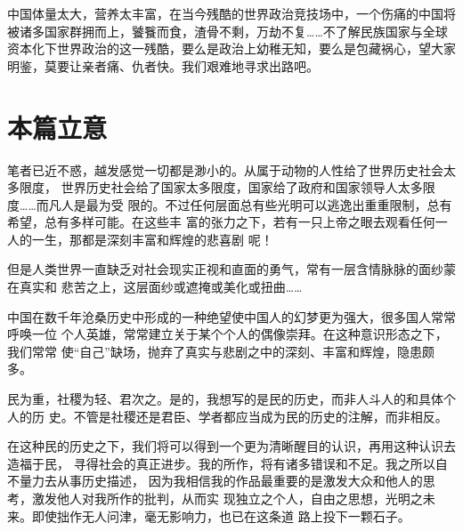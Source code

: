 中国体量太大，营养太丰富，在当今残酷的世界政治竞技场中，一个伤痛的中国将被诸多国家群拥而上，饕餮而食，渣骨不剩，万劫不复……不了解民族国家与全球资本化下世界政治的这一残酷，要么是政治上幼稚无知，要么是包藏祸心，望大家明鉴，莫要让亲者痛、仇者快。我们艰难地寻求出路吧。

\section{本篇立意}

笔者已近不惑，越发感觉一切都是渺小的。从属于动物的人性给了世界历史社会太多限度，
世界历史社会给了国家太多限度，国家给了政府和国家领导人太多限度……而凡人是最为受
限的。不过任何层面总有些光明可以逃逸出重重限制，总有希望，总有多样可能。在这些丰
富的张力之下，若有一只上帝之眼去观看任何一人的一生，那都是深刻丰富和辉煌的悲喜剧
呢！

但是人类世界一直缺乏对社会现实正视和直面的勇气，常有一层含情脉脉的面纱蒙在真实和
悲苦之上，这层面纱或遮掩或美化或扭曲……

中国在数千年沧桑历史中形成的一种绝望使中国人的幻梦更为强大，很多国人常常呼唤一位
个人英雄，常常建立关于某个个人的偶像崇拜。在这种意识形态之下，我们常常
使“自己”缺场，抛弃了真实与悲剧之中的深刻、丰富和辉煌，隐患颇多。






民为重，社稷为轻、君次之。是的，我想写的是民的历史，而非人斗人的和具体个人的历
史。不管是社稷还是君臣、学者都应当成为民的历史的注解，而非相反。

在这种民的历史之下，我们将可以得到一个更为清晰醒目的认识，再用这种认识去造福于民，
寻得社会的真正进步。我的所作，将有诸多错误和不足。我之所以自不量力去从事历史描述，
因为我相信我的作品最重要的是激发大众和他人的思考，激发他人对我所作的批判，从而实
现独立之个人，自由之思想，光明之未来。即使拙作无人问津，毫无影响力，也已在这条道
路上投下一颗石子。

